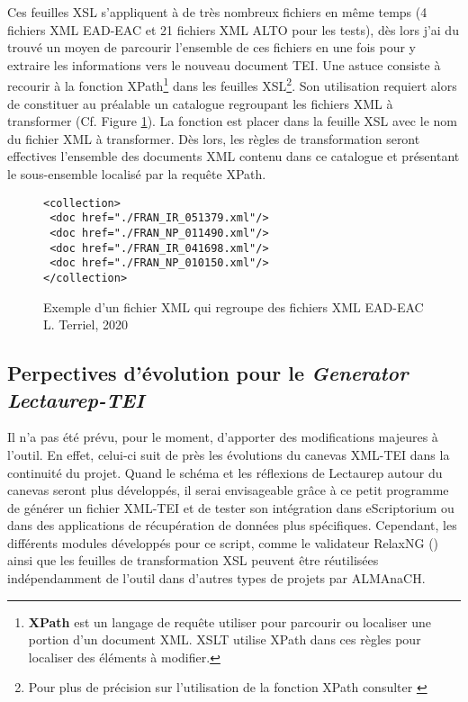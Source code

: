 Ces feuilles XSL s'appliquent à de très nombreux fichiers en même temps (4 fichiers XML EAD-EAC et 21 fichiers XML ALTO pour les tests), dès lors j'ai du trouvé un moyen de parcourir l'ensemble de ces fichiers en une fois pour y extraire les informations vers le nouveau document TEI. Une astuce consiste à recourir à la fonction XPath\footnote{\textbf{XPath} est un langage de requête utiliser pour parcourir ou localiser une portion d'un document XML. XSLT utilise XPath dans ces règles pour localiser des éléments à modifier.}  dans les feuilles XSL\footnote{Pour plus de précision sur l'utilisation de la fonction XPath  consulter \cite{holmes_xpath_nodate-1}}. Son utilisation requiert alors de constituer au préalable un catalogue regroupant les fichiers XML à transformer (Cf. Figure \ref{fig:catalogue}). La fonction est placer dans la feuille XSL avec le nom du fichier XML  à transformer. Dès lors, les règles de transformation seront effectives  l'ensemble des documents XML contenu dans ce catalogue et présentant le sous-ensemble localisé par la requête XPath.

\begin{figure}[h]
\lstset{language=XML}
\begin{lstlisting}
<collection>
 <doc href="./FRAN_IR_051379.xml"/>
 <doc href="./FRAN_NP_011490.xml"/>
 <doc href="./FRAN_IR_041698.xml"/>
 <doc href="./FRAN_NP_010150.xml"/>
</collection>
\end{lstlisting}
\caption{Exemple d'un fichier XML  qui regroupe des fichiers XML EAD-EAC  \textcopyright L. Terriel, 2020}
\label{fig:catalogue}
\end{figure}

\subsection{Perpectives d'évolution pour le \textit{Generator Lectaurep-TEI}}

Il n'a pas été prévu, pour le moment, d'apporter des modifications majeures à l'outil. En effet, celui-ci suit de près les évolutions du canevas XML-TEI dans la continuité du projet. Quand le schéma et les réflexions de Lectaurep autour du canevas seront plus développés, il serai envisageable grâce à ce petit programme de générer un fichier XML-TEI et de tester son intégration dans eScriptorium ou dans des applications de récupération de données plus spécifiques. Cependant, les différents modules développés pour ce script, comme le validateur RelaxNG () ainsi que les feuilles de transformation XSL peuvent être réutilisées indépendamment de l'outil dans d'autres types de projets par ALMAnaCH.

\clearpage
\thispagestyle{empty}
